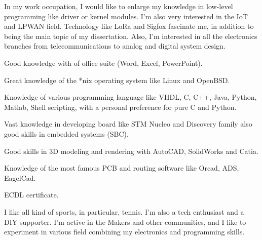 \documentclass[english,a4paper]{europasscv}
\begin{document}
\begin{europasscv}
		 {
			\begin{ecvitemize}
				\item In my work occupation, I would like to enlarge my
				knowledge in low-level programming like driver or kernel modules.
				I'm also very interested in the IoT and LPWAN field.
				Technology like LoRa and Sigfox fascinate me, in addition to
				being the main topic of my dissertation.  Also, I'm interested
				in all the electronics branches from telecommunications to
				analog and digital system design.
			\end{ecvitemize}}

		 {
			\begin{ecvitemize}
				\item Good knowledge with of office suite (Word, Excel, PowerPoint).
				\item Great knowledge of the *nix operating system like Linux
					and OpenBSD.
				\item Knowledge of various programming language like VHDL, C,
					C++, Java, Python, Matlab, Shell
					scripting, with a personal preference for pure C and Python.
				\item Vast knowledge in developing board like STM Nucleo and
					Discovery family also good skills in embedded systems (SBC).
				\item Good skills in 3D modeling and rendering with AutoCAD,
					SolidWorks and Catia.
				\item Knowledge of the most famous PCB and routing software like
					Orcad, ADS, EagelCad.
				\item ECDL certificate.
			\end{ecvitemize}
		}

		 {
			I like all kind of sports, in particular, tennis. I'm also a tech
			enthusiast and a DIY supporter. I'm active in the Makers and other
			communities, and  I like to experiment in various field combining
			my electronics and programming skills.
		}


	\end{europasscv}
\end{document}
